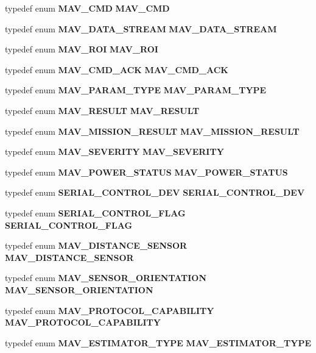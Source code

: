 \begin{DoxyCompactItemize}
\item 
typedef enum \textbf{ M\+A\+V\+\_\+\+C\+MD} \textbf{ M\+A\+V\+\_\+\+C\+MD}
\item 
typedef enum \textbf{ M\+A\+V\+\_\+\+D\+A\+T\+A\+\_\+\+S\+T\+R\+E\+AM} \textbf{ M\+A\+V\+\_\+\+D\+A\+T\+A\+\_\+\+S\+T\+R\+E\+AM}
\item 
typedef enum \textbf{ M\+A\+V\+\_\+\+R\+OI} \textbf{ M\+A\+V\+\_\+\+R\+OI}
\item 
typedef enum \textbf{ M\+A\+V\+\_\+\+C\+M\+D\+\_\+\+A\+CK} \textbf{ M\+A\+V\+\_\+\+C\+M\+D\+\_\+\+A\+CK}
\item 
typedef enum \textbf{ M\+A\+V\+\_\+\+P\+A\+R\+A\+M\+\_\+\+T\+Y\+PE} \textbf{ M\+A\+V\+\_\+\+P\+A\+R\+A\+M\+\_\+\+T\+Y\+PE}
\item 
typedef enum \textbf{ M\+A\+V\+\_\+\+R\+E\+S\+U\+LT} \textbf{ M\+A\+V\+\_\+\+R\+E\+S\+U\+LT}
\item 
typedef enum \textbf{ M\+A\+V\+\_\+\+M\+I\+S\+S\+I\+O\+N\+\_\+\+R\+E\+S\+U\+LT} \textbf{ M\+A\+V\+\_\+\+M\+I\+S\+S\+I\+O\+N\+\_\+\+R\+E\+S\+U\+LT}
\item 
typedef enum \textbf{ M\+A\+V\+\_\+\+S\+E\+V\+E\+R\+I\+TY} \textbf{ M\+A\+V\+\_\+\+S\+E\+V\+E\+R\+I\+TY}
\item 
typedef enum \textbf{ M\+A\+V\+\_\+\+P\+O\+W\+E\+R\+\_\+\+S\+T\+A\+T\+US} \textbf{ M\+A\+V\+\_\+\+P\+O\+W\+E\+R\+\_\+\+S\+T\+A\+T\+US}
\item 
typedef enum \textbf{ S\+E\+R\+I\+A\+L\+\_\+\+C\+O\+N\+T\+R\+O\+L\+\_\+\+D\+EV} \textbf{ S\+E\+R\+I\+A\+L\+\_\+\+C\+O\+N\+T\+R\+O\+L\+\_\+\+D\+EV}
\item 
typedef enum \textbf{ S\+E\+R\+I\+A\+L\+\_\+\+C\+O\+N\+T\+R\+O\+L\+\_\+\+F\+L\+AG} \textbf{ S\+E\+R\+I\+A\+L\+\_\+\+C\+O\+N\+T\+R\+O\+L\+\_\+\+F\+L\+AG}
\item 
typedef enum \textbf{ M\+A\+V\+\_\+\+D\+I\+S\+T\+A\+N\+C\+E\+\_\+\+S\+E\+N\+S\+OR} \textbf{ M\+A\+V\+\_\+\+D\+I\+S\+T\+A\+N\+C\+E\+\_\+\+S\+E\+N\+S\+OR}
\item 
typedef enum \textbf{ M\+A\+V\+\_\+\+S\+E\+N\+S\+O\+R\+\_\+\+O\+R\+I\+E\+N\+T\+A\+T\+I\+ON} \textbf{ M\+A\+V\+\_\+\+S\+E\+N\+S\+O\+R\+\_\+\+O\+R\+I\+E\+N\+T\+A\+T\+I\+ON}
\item 
typedef enum \textbf{ M\+A\+V\+\_\+\+P\+R\+O\+T\+O\+C\+O\+L\+\_\+\+C\+A\+P\+A\+B\+I\+L\+I\+TY} \textbf{ M\+A\+V\+\_\+\+P\+R\+O\+T\+O\+C\+O\+L\+\_\+\+C\+A\+P\+A\+B\+I\+L\+I\+TY}
\item 
typedef enum \textbf{ M\+A\+V\+\_\+\+E\+S\+T\+I\+M\+A\+T\+O\+R\+\_\+\+T\+Y\+PE} \textbf{ M\+A\+V\+\_\+\+E\+S\+T\+I\+M\+A\+T\+O\+R\+\_\+\+T\+Y\+PE}

\end{DoxyCompactItemize}
